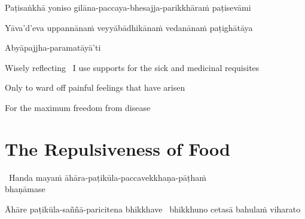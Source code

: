 \begin{pali-hang}
Paṭisaṅkhā yoniso gilāna-paccaya-bhesajja-parikkhāraṁ paṭisevāmi\\
\end{pali-hang}
\begin{pali-hang-together}
Yāva'd'eva uppannānaṁ veyyābādhikānaṁ vedanānaṁ paṭighātāya\\
\end{pali-hang-together}
\begin{pali-hang-together}
Abyāpajjha-paramatāyā'ti
\end{pali-hang-together}

\begin{english-keep-with}
\begin{english-hang-first-line}
  Wisely reflecting \breathmark\ I use supports for the sick and medicinal requisites\\
\end{english-hang-first-line}
\begin{english-hang-together}
  Only to ward off painful feelings that have arisen\\
\end{english-hang-together}
\begin{english-hang-together}
  For the maximum freedom from disease
\end{english-hang-together}
\end{english-keep-with}

\suttaRef{[MN 2]}

\ifdigital{}\fi



\section{The Repulsiveness of Food}
\label{repulsiveness-of-food}

\begin{leader}
  \anglebracketleft\ \hspace{-0.5mm}Handa mayaṁ āhāra-paṭikūla-paccavekkhaṇa-pāṭhaṁ\\ bhaṇāmase \hspace{-0.5mm}\anglebracketright\
\end{leader}

\begin{pali-hang}
  Āhāre paṭikūla-saññā-paricitena bhikkhave \breathmark\ bhikkhuno cetasā bahulaṁ viharato
\end{pali-hang}

